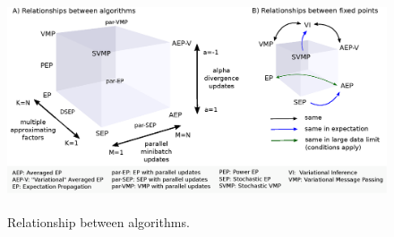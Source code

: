 
\begin{figure}
\centering
\def\svgwidth{1\linewidth}
\includegraphics[height=6.5cm]{fig/relationship-algorithms.eps}%
\caption{Relationship between algorithms.}
\end{figure}

